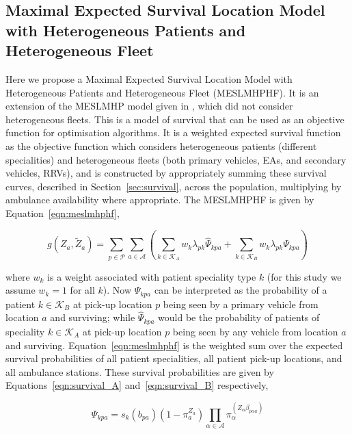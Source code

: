 \documentclass[preprint,12pt]{elsarticle}
\begin{document}
\subsection{Maximal Expected Survival Location Model with Heterogeneous
            Patients and Heterogeneous Fleet}\label{sec:meslmhphf}
Here we propose a Maximal Expected Survival Location Model with Heterogeneous
Patients and Heterogeneous Fleet (MESLMHPHF). It is an extension of the
MESLMHP model given in \cite{Knight2012918}, which did not consider
heterogeneous fleets. This is a model of survival that can be used as an
objective function for optimisation algorithms. It is a weighted expected
survival function as the objective function which considers heterogeneous
patients (different specialities) and heterogeneous fleets (both primary
vehicles, EAs, and secondary vehicles, RRVs), and is constructed by
appropriately summing these survival curves, described in
Section~\ref{sec:survival}, across the population, multiplying by ambulance
availability where appropriate.
The MESLMHPHF is given by Equation~\ref{eqn:meslmhphf},

\begin{equation}\label{eqn:meslmhphf}
g\left(Z_a, \tilde{Z}_a\right) =
\sum_{p \in \mathcal{P}} \sum_{a \in \mathcal{A}}
\left( \sum_{k \in \mathcal{K}_A}  w_k \lambda_{pk} \hat{\Psi}_{kpa} +
\sum_{k \in \mathcal{K}_B}  w_k \lambda_{pk} \Psi_{kpa} \right)
\end{equation}

where $w_k$ is a weight associated with patient speciality type $k$ (for this
study we assume $w_k = 1$ for all $k$). Now $\Psi_{kpa}$ can be interpreted as
the probability of a patient $k \in \mathcal{K}_B$ at pick-up location $p$
being seen by a primary vehicle from location $a$ and surviving; while
$\hat{\Psi}_{kpa}$ would be the probability of patients of speciality
$k \in \mathcal{K}_A$ at pick-up location $p$ being seen by any vehicle from
location $a$ and surviving. Equation~\ref{eqn:meslmhphf} is the weighted sum
over the expected survival probabilities of all patient specialities, all
patient pick-up locations, and all ambulance stations. These survival
probabilities are given by Equations~\ref{eqn:survival_A}
and~\ref{eqn:survival_B} respectively,

\begin{equation}\label{eqn:survival_A}
\Psi_{kpa} = s_k\left( b_{pa} \right)
\left(1 - \pi_{a}^{Z_a} \right)
\prod_{\alpha \in \mathcal{A}}
\pi_{\alpha}^{\left(Z_{\alpha} \beta_{p\alpha a} \right)}
\end{equation}
\end{document}
